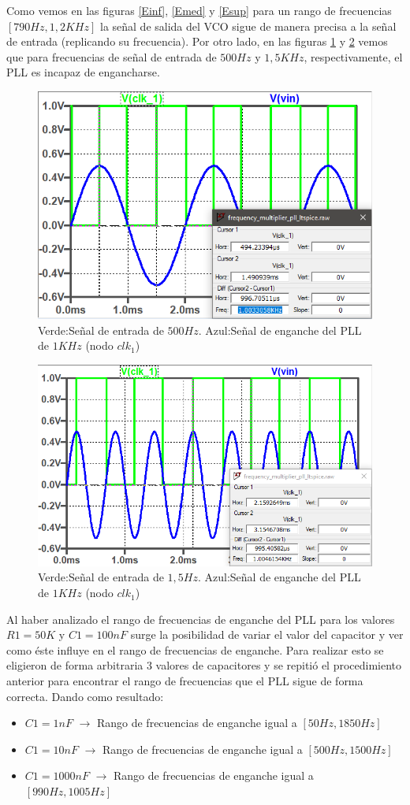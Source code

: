 \documentclass[10pt,a4paper]{IEEEtran}
\begin{document}
Como vemos en las figuras \ref{Einf}, \ref{Emed} y \ref{Esup} para un rango de frecuencias $[790Hz,1,2KHz]$ la señal de salida del VCO 
sigue de manera precisa a la señal de entrada (replicando su frecuencia). Por otro lado, en las figuras \ref{NEinf} y \ref{NEsup} vemos que para frecuencias de señal
de entrada de $500Hz$ y $1,5KHz$, respectivamente, el PLL es incapaz de engancharse.
\begin{figure}[H]
    \centering
    \includegraphics[width=.45\textwidth]{Fig/NoEnganche500}
    \caption{Verde:Señal de entrada de $500Hz$. Azul:Señal de enganche del PLL de $1KHz$ (nodo $clk_1$)}
    \label{NEinf}
\end{figure}
\begin{figure}[H]
    \centering
    \includegraphics[width=.45\textwidth]{Fig/NoEnganche1500}
    \caption{Verde:Señal de entrada de $1,5Hz$. Azul:Señal de enganche del PLL de $1KHz$ (nodo $clk_1$)}
    \label{NEsup}
\end{figure}
Al haber analizado el rango de frecuencias de enganche del PLL para los valores $R1=50K$ y $C1=100nF$ surge la posibilidad de variar el valor del capacitor 
y ver como éste influye en el rango de frecuencias de enganche. Para realizar esto se eligieron de forma arbitraria 3 valores de capacitores y se repitió el procedimiento anterior 
para encontrar el rango de frecuencias que el PLL sigue de forma correcta. Dando como resultado:
\begin{itemize}
    \item $C1=1nF$ $\rightarrow$ Rango de frecuencias de enganche igual a $[50Hz,1850Hz]$
    \item $C1=10nF$ $\rightarrow$ Rango de frecuencias de enganche igual a $[500Hz,1500Hz]$
    \item $C1=1000nF$ $\rightarrow$ Rango de frecuencias de enganche igual a $[990Hz,1005Hz]$
\end{itemize}
\end{document}
